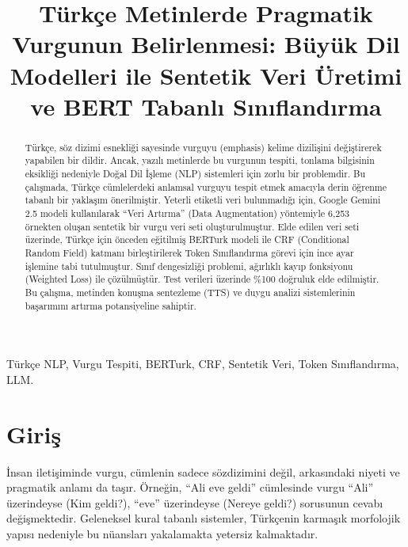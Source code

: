 \documentclass[conference]{IEEEtran}
\begin{document}
\title{Türkçe Metinlerde Pragmatik Vurgunun Belirlenmesi: Büyük Dil Modelleri ile Sentetik Veri Üretimi ve BERT Tabanlı Sınıflandırma}

\author{
}

\maketitle

\begin{abstract}
Türkçe, söz dizimi esnekliği sayesinde vurguyu (emphasis) kelime dizilişini değiştirerek yapabilen bir dildir. Ancak, yazılı metinlerde bu vurgunun tespiti, tonlama bilgisinin eksikliği nedeniyle Doğal Dil İşleme (NLP) sistemleri için zorlu bir problemdir. Bu çalışmada, Türkçe cümlelerdeki anlamsal vurguyu tespit etmek amacıyla derin öğrenme tabanlı bir yaklaşım önerilmiştir. Yeterli etiketli veri bulunmadığı için, Google Gemini 2.5 modeli kullanılarak ``Veri Artırma'' (Data Augmentation) yöntemiyle 6,253 örnekten oluşan sentetik bir vurgu veri seti oluşturulmuştur. Elde edilen veri seti üzerinde, Türkçe için önceden eğitilmiş BERTurk modeli ile CRF (Conditional Random Field) katmanı birleştirilerek Token Sınıflandırma görevi için ince ayar işlemine tabi tutulmuştur. Sınıf dengesizliği problemi, ağırlıklı kayıp fonksiyonu (Weighted Loss) ile çözülmüştür. Test verileri üzerinde \%100 doğruluk elde edilmiştir. Bu çalışma, metinden konuşma sentezleme (TTS) ve duygu analizi sistemlerinin başarımını artırma potansiyeline sahiptir.
\end{abstract}

\begin{IEEEkeywords}
Türkçe NLP, Vurgu Tespiti, BERTurk, CRF, Sentetik Veri, Token Sınıflandırma, LLM.
\end{IEEEkeywords}

\section{Giriş}
İnsan iletişiminde vurgu, cümlenin sadece sözdizimini değil, arkasındaki niyeti ve pragmatik anlamı da taşır. Örneğin, ``Ali eve geldi'' cümlesinde vurgu ``Ali'' üzerindeyse (Kim geldi?), ``eve'' üzerindeyse (Nereye geldi?) sorusunun cevabı değişmektedir. Geleneksel kural tabanlı sistemler, Türkçenin karmaşık morfolojik yapısı nedeniyle bu nüansları yakalamakta yetersiz kalmaktadır.
\end{document}
